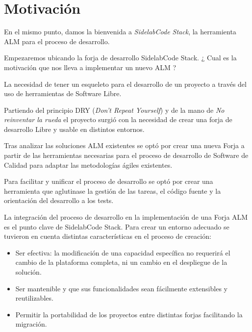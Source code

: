 %
% 

\chapter{Motivaci\'on}
\label{chap:motivacion}

\par En el mismo punto, damos la bienvenida a \emph{SidelabCode Stack}, la herramienta ALM para el proceso de desarrollo.

\par Empezaremos ubicando la forja de desarrollo SidelabCode Stack. ¿ Cual es la motivaci\'on que nos lleva a implementar un nuevo ALM ?

\par La necesidad de tener un esqueleto para el desarrollo de un proyecto a trav\'es del uso de herramientas de Software Libre.

\par Partiendo del principio DRY (\emph{Don't Repeat Yourself}) y de la mano de \emph{No reinventar la rueda} el proyecto surgi\'o con la necesidad de crear una forja de desarrollo Libre y usable en distintos entornos.

\par Tras analizar las soluciones ALM existentes se opt\'o por crear una nueva Forja a partir de las herramientas necesarias para el proceso de desarrollo de Software de Calidad para adaptar las metodolog\'ias \'agiles existentes.

\par Para facilitar y unificar el proceso de desarrollo se optó por crear una herramienta que aglutinase la gestión de las tareas, el código fuente y la orientación del desarrollo a los tests.

\par La integraci\'on del proceso de desarrollo en la implementaci\'on de una Forja ALM es el punto clave de SidelabCode Stack. Para crear un entorno adecuado se tuvieron en cuenta distintas características en el proceso de creación:

\begin{itemize}
	\item Ser efectiva: la modificaci\'on de una capacidad espec\'ifica no requerir\'a el cambio de la plataforma completa, ni un cambio en el despliegue de la soluci\'on.
	\item Ser mantenible y que sus funcionalidades sean f\'acilmente extensibles y reutilizables.
	\item Permitir la portabilidad de los proyectos entre distintas forjas facilitando la migración.
\end{itemize}

